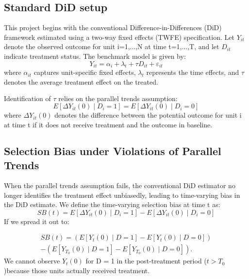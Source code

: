 \documentclass[12pt]{article}
\begin{document}
\subsection{Standard DiD setup}

This project begins with the conventional Difference-in-Differences (DiD) framework estimated using a two-way fixed effects (TWFE) specification. Let $Y_{it}$ denote the observed outcome for unit i=1,...,N at time t=1,...,T, and let $D_{it}$ indicate treatment status. The benchmark model is given by:
\begin{equation}
    Y_{it} = \alpha_i + \lambda_t + \tau D_{it} + \varepsilon_{it}
    \label{eq:placeholder_label}
\end{equation}
where \(\alpha_{it}\) captures unit-specific fixed effects, \(\lambda_t\) represents the time effects, and \(\tau\) denotes the average treatment effect on the treated. 

Identification of \(\tau\) relies on the parallel trends assumption: 
\begin{equation}
    E[\Delta Y_{it}(0)\mid D_i = 1] = E[\Delta Y_{it}(0)\mid D_i = 0]
    \label{eq:placeholder_label}
\end{equation}
where \( \Delta Y_{it}(0)\) denotes the difference between the potential outcome for unit i at time t if it does not receive treatment and the outcome in baseline.

\subsection{Selection Bias under Violations of Parallel Trends}

When the parallel trends assumption fails, the conventional DiD estimator no longer identifies the treatment effect unbiasedly, leading to time-varying bias in the DiD estimate. We define the time-varying selection bias at time t as:
\begin{equation}
   SB(t) = E[\Delta Y_{it}(0)\mid D_i = 1] - E[\Delta Y_{it}(0)\mid D_i = 0]
    \label{eq:placeholder_label}
\end{equation}
If we spread it out to:

\begin{equation}
\begin{split}
    SB(t) = \left( E[Y_t(0) \mid D = 1] - E[Y_{t}(0) \mid D = 0] \right) \\ - \left( E [Y_{T_0}(0) \mid D = 1] - E[Y_{T_0}(0) \mid D = 0] \right).
    \label{eq:placeholder_label}
\end{split}
\end{equation}
We cannot observe \(Y_t(0)\) for D = 1 in the post-treatment period (\(t > T_0 \))because those units actually received treatment.
\end{document}

